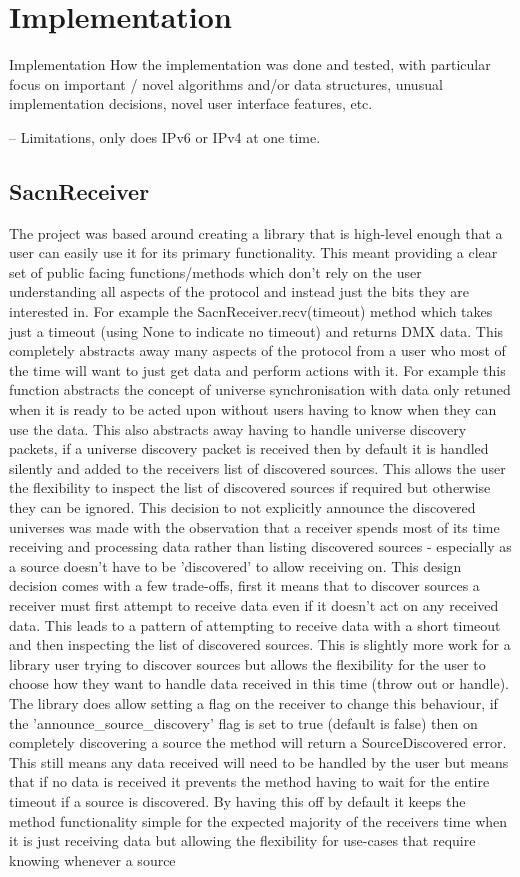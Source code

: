 \documentclass[11pt,a4paper]{article}
\begin{document}
\section{Implementation}
Implementation
How the implementation was done and tested, with particular focus on important / novel algorithms and/or data structures, unusual implementation decisions, novel user interface features, etc.

-- Limitations, only does IPv6 or IPv4 at one time.


\subsection{SacnReceiver}
The project was based around creating a library that is high-level enough that a user can easily use it for its primary functionality. This meant providing a clear set of public facing functions/methods which don't rely on the user understanding all aspects of the protocol and instead just the bits they are interested in. For example the SacnReceiver.recv(timeout) method which takes just a timeout (using None to indicate no timeout) and returns DMX data. This completely abstracts away many aspects of the protocol from a user who most of the time will want to just get data and perform actions with it. For example this function abstracts the concept of universe synchronisation with data only retuned when it is ready to be acted upon without users having to know when they can use the data. This also abstracts away having to handle universe discovery packets, if a universe discovery packet is received then by default it is handled silently and added to the receivers list of discovered sources. This allows the user the flexibility to inspect the list of discovered sources if required but otherwise they can be ignored. This decision to not explicitly announce the discovered universes was made with the observation that a receiver spends most of its time receiving and processing data rather than listing discovered sources - especially as a source doesn't have to be 'discovered' to allow receiving on. This design decision comes with a few trade-offs, first it means that to discover sources a receiver must first attempt to receive data even if it doesn't act on any received data. This leads to a pattern of attempting to receive data with a short timeout and then inspecting the list of discovered sources. This is slightly more work for a library user trying to discover sources but allows the flexibility for the user to choose how they want to handle data received in this time (throw out or handle). The library does allow setting a flag on the receiver to change this behaviour, if the 'announce\_source\_discovery' flag is set to true (default is false) then on completely discovering a source the method will return a SourceDiscovered error. This still means any data received will need to be handled by the user but means that if no data is received it prevents the method having to wait for the entire timeout if a source is discovered. By having this off by default it keeps the method functionality simple for the expected majority of the receivers time when it is just receiving data but allowing the flexibility for use-cases that require knowing whenever a source 
\end{document}
